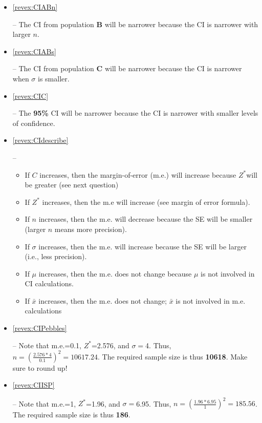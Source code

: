 \documentclass[10pt,openany]{book}\usepackage[]{graphicx}\usepackage[]{color}
\begin{document}
\begin{itemize}
  \item \hypertarget{ans:CIABn}{\ref{revex:CIABn}} -- The CI from population \textbf{B} will be narrower because the CI is narrower with larger $n$.
  \item \hypertarget{ans:CIABs}{\ref{revex:CIABs}} -- The CI from population \textbf{C} will be narrower because the CI is narrower when $\sigma$ is smaller.
  \item \hypertarget{ans:CIC}{\ref{revex:CIC}} -- The \textbf{95\%} CI will be narrower because the CI is narrower with smaller levels of confidence.
  \item \hypertarget{ans:CIdescribe}{\ref{revex:CIdescribe}} --
    \begin{itemize}
      \item If $C$ increases, then the margin-of-error (m.e.) will increase because $Z^{*}$will be greater (see next question)
      \item If $Z^{*}$ increases, then the m.e will increase (see margin of error formula).
      \item If $n$ increases, then the m.e. will decrease because the SE will be smaller (larger $n$ means more precision).
      \item If $\sigma$ increases, then the m.e. will increase because the SE will be larger (i.e., less precision).
      \item If $\mu$ increases, then the m.e. does not change because $\mu$ is not involved in CI calculations.
      \item If $\bar{x}$ increases, then the m.e. does not change; $\bar{x}$ is not involved in m.e. calculations
    \end{itemize}
  \item \hypertarget{ans:CIPebbles}{\ref{revex:CIPebbles}} -- Note that m.e.=0.1, $Z^{*}$=2.576, and $\sigma=$4.  Thus, $n=\left(\frac{2.576*4}{0.1}\right)^{2}=10617.24$.  The required sample size is thus \textbf{10618}.  Make sure to round up!
  \item \hypertarget{ans:CIISP}{\ref{revex:CIISP}} -- Note that m.e.=1, $Z^{*}$=1.96, and $\sigma=$6.95.  Thus, $n=\left(\frac{1.96*6.95}{1}\right)^{2}=185.56$.  The required sample size is thus \textbf{186}.
\end{itemize}





\end{document}
